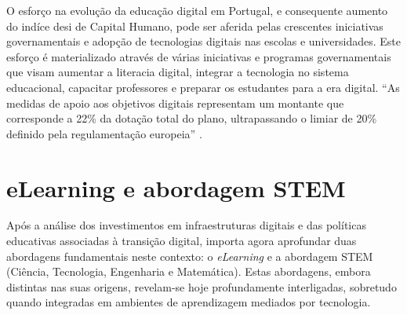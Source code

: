 O esforço na evolução da educação digital em Portugal, e consequente aumento do indíce \acrshort{desi} de Capital Humano,  pode ser aferida pelas crescentes iniciativas governamentais e adopção de tecnologias digitais nas escolas e universidades. Este esforço é materializado através de várias iniciativas e programas governamentais que visam aumentar a literacia digital, integrar a tecnologia no sistema educacional, capacitar professores e preparar os estudantes para a era digital. ``As medidas de apoio aos objetivos digitais representam um montante que corresponde a 22\% da dotação total do plano, ultrapassando o limiar de 20\% definido pela regulamentação europeia'' \cite{Transicaodigitalprr}.

\section{eLearning e abordagem STEM} %
\label{sec:elearningstem}	%

Após a análise dos investimentos em infraestruturas digitais e das políticas educativas associadas à transição digital, importa agora aprofundar duas abordagens fundamentais neste contexto: o \textit{eLearning} e a abordagem STEM (Ciência, Tecnologia, Engenharia e Matemática). Estas abordagens, embora distintas nas suas origens, revelam-se hoje profundamente interligadas, sobretudo quando integradas em ambientes de aprendizagem mediados por tecnologia.

